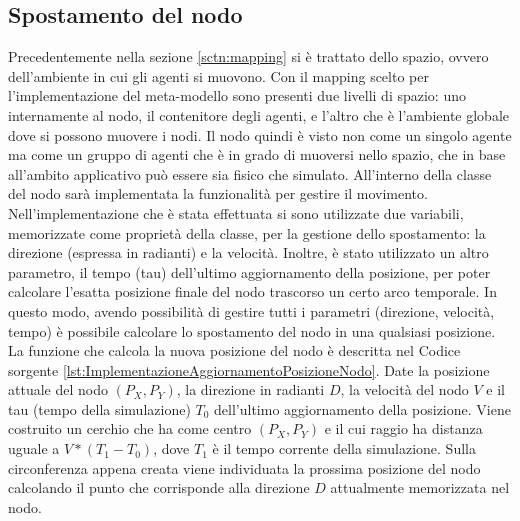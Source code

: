 \subsection{Spostamento del nodo}\label{sctn:SpostamentoNodo}
Precedentemente nella sezione \ref{sctn:mapping} si è trattato dello spazio, ovvero dell'ambiente in cui gli agenti si muovono. Con il mapping scelto per l'implementazione del meta-modello sono presenti due livelli di spazio: uno internamente al nodo, il contenitore degli agenti, e l'altro che è l'ambiente globale dove si possono muovere i nodi.
Il nodo quindi è visto non come un singolo agente ma come un gruppo di agenti che è in grado di muoversi nello spazio, che in base all'ambito applicativo può essere sia fisico che simulato. All'interno della classe del nodo sarà implementata la funzionalità per gestire il movimento.
\\
Nell'implementazione che è stata effettuata si sono utilizzate due variabili, memorizzate come proprietà della classe, per la gestione dello spostamento: la direzione (espressa in radianti) e la velocità. Inoltre, è stato utilizzato un altro parametro, il tempo (tau) dell'ultimo aggiornamento della posizione, per poter calcolare l'esatta posizione finale del nodo trascorso un certo arco temporale. In questo modo, avendo possibilità di gestire tutti i parametri (direzione, velocità, tempo) è possibile calcolare lo spostamento del nodo in una qualsiasi posizione.
\\
La funzione che calcola la nuova posizione del nodo è descritta nel Codice sorgente \ref{lst:ImplementazioneAggiornamentoPosizioneNodo}. Date la posizione attuale del nodo $(P_X,P_Y)$, la direzione in radianti $D$, la velocità del nodo $V$ e il tau (tempo della simulazione) $T_0$ dell'ultimo aggiornamento della posizione. Viene costruito un cerchio che ha come centro $(P_X,P_Y)$ e il cui raggio ha distanza uguale a $V * (T_1 - T_0)$, dove $T_1$ è il tempo corrente della simulazione. Sulla circonferenza appena creata viene individuata la prossima posizione del nodo calcolando il punto che corrisponde alla direzione $D$ attualmente memorizzata nel nodo.

